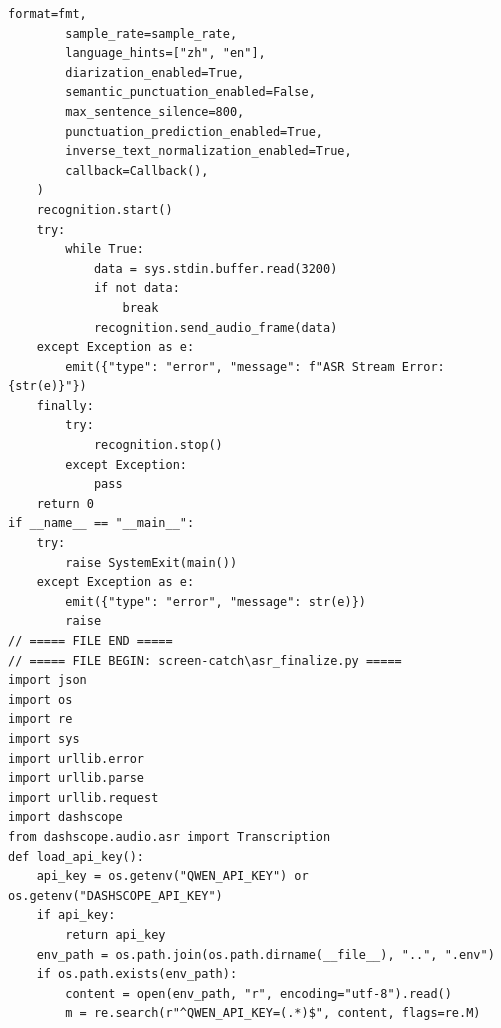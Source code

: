 \documentclass[12pt,a4paper]{article}
\begin{document}
\begin{Verbatim}[fontsize=\footnotesize]
        format=fmt,
        sample_rate=sample_rate,
        language_hints=["zh", "en"],
        diarization_enabled=True,
        semantic_punctuation_enabled=False,
        max_sentence_silence=800,
        punctuation_prediction_enabled=True,
        inverse_text_normalization_enabled=True,
        callback=Callback(),
    )
    recognition.start()
    try:
        while True:
            data = sys.stdin.buffer.read(3200)
            if not data:
                break
            recognition.send_audio_frame(data)
    except Exception as e:
        emit({"type": "error", "message": f"ASR Stream Error: {str(e)}"})
    finally:
        try:
            recognition.stop()
        except Exception:
            pass
    return 0
if __name__ == "__main__":
    try:
        raise SystemExit(main())
    except Exception as e:
        emit({"type": "error", "message": str(e)})
        raise
// ===== FILE END =====
// ===== FILE BEGIN: screen-catch\asr_finalize.py =====
import json
import os
import re
import sys
import urllib.error
import urllib.parse
import urllib.request
import dashscope
from dashscope.audio.asr import Transcription
def load_api_key():
    api_key = os.getenv("QWEN_API_KEY") or os.getenv("DASHSCOPE_API_KEY")
    if api_key:
        return api_key
    env_path = os.path.join(os.path.dirname(__file__), "..", ".env")
    if os.path.exists(env_path):
        content = open(env_path, "r", encoding="utf-8").read()
        m = re.search(r"^QWEN_API_KEY=(.*)$", content, flags=re.M)
\end{Verbatim}
\newpage
{}
\fancyhead[R]{}
\end{document}
